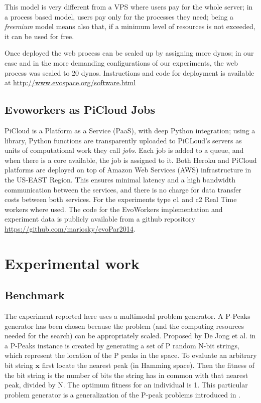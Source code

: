 \documentclass{llncs}
\begin{document}
This model is very different from a VPS where users pay for the
whole server; in a process based model, users pay only for the
processes they need; being a {\em freemium} model means also that, if
a minimum level of resources is not exceeded, it can be used for
free. 

Once deployed the web process can be scaled up by assigning more dynos;
in our case and in the more demanding configurations of our experiments, 
the web process was scaled to 20 dynos. Instructions and code for deployment 
is available at \url{http://www.evospace.org/software.html} %



\subsection{Evoworkers as PiCloud Jobs}
PiCloud is a Platform as a Service (PaaS), with deep Python integration; 
using a library, Python functions are transparently uploaded to PiCLoud's 
servers as units of computational work they call \emph{jobs}. 
Each job is added to a queue, and when there is a core available, 
the job is assigned to it. Both Heroku and PiCloud 
platforms are deployed  on top of Amazon Web Services (AWS) 
infrastructure in the US-EAST Region. This ensures minimal 
latency and a high bandwidth communication between the services, 
and there is no charge for data transfer costs between both services.
For the experiments type c1 and c2 Real Time workers where used.  
The code for the EvoWorkers implementation and experiment data is publicly available 
from a github repository \url{https://github.com/mariosky/evoPar2014}. 

\section{Experimental work}
\label{sec:experiments}
\subsection{Benchmark}
\label{ss:benchmark}
The experiment reported here uses a multimodal problem generator. A P-Peaks generator
has been chosen because the problem (and the computing resources needed for the search) 
can be appropriately scaled. Proposed by De Jong et al. in \cite{Jong:PS97} a
P-Peaks instance is created by generating a set of P random N-bit
strings, which represent the location of the P peaks in the space. To
evaluate an arbitrary bit string \begin{math} \mathbf{x} \end{math}
first locate the nearest peak (in Hamming space). Then the fitness of
the bit string is the number of bits the string has in common with
that nearest peak, divided by N. The optimum fitness for an individual
is 1. This particular problem generator is a generalization of the
P-peak problems introduced in \cite{Jong:1990}.            
\end{document}
